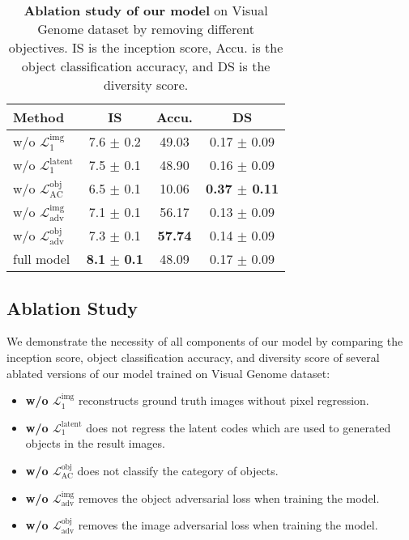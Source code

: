\documentclass[10pt,twocolumn,letterpaper]{article}
\begin{document}
\begin{table}[!t]
\centering
\begin{tabular}{l|ccc}
\textbf{Method}     & \textbf{IS}   & \textbf{Accu.}  & \textbf{DS}   \\\hline 
w/o $\mathcal{L}_1^\mathrm{img }$      & 7.6 $\pm$ 0.2   & 49.03 & 0.17 $\pm$ 0.09 \\
w/o $\mathcal{L}_1^\mathrm{latent}$   & 7.5 $\pm$ 0.1   & 48.90 & 0.16 $\pm$ 0.09 \\
w/o $\mathcal{L}_\mathrm{AC}^\mathrm{obj}$        & 6.5 $\pm$ 0.1   & 10.06 & \textbf{0.37 $\pm$ 0.11} \\
w/o $\mathcal{L}_\mathrm{adv}^\mathrm{img}$ & 7.1 $\pm$ 0.1 & 56.17 & 0.13 $\pm$ 0.09\\
w/o $\mathcal{L}_\mathrm{adv}^\mathrm{obj}$ & 7.3 $\pm$ 0.1 & \textbf{57.74} & 0.14 $\pm$ 0.09 \\\hline
full model         & \textbf{8.1} $\pm$ \textbf{0.1} & 48.09 &  0.17 $\pm$ 0.09 \\ 
\end{tabular}
\vspace{0.1in}
\caption{\textbf{Ablation study of our model} on Visual Genome dataset by removing different objectives. IS is the inception score, Accu. is the object classification accuracy, and DS is the diversity score.}
\label{tb:ablation}
\vspace{-0.2in}
\end{table}



\subsection{Ablation Study}
We demonstrate the necessity of all components of our model by comparing the inception score, object classification accuracy, and diversity score of several ablated versions of our model trained on Visual Genome dataset:
\begin{itemize}[leftmargin=*]
\setlength{\itemsep}{0pt}
	\item \textbf{w/o $\mathcal{L}_1^\mathrm{img}$} reconstructs ground truth images without pixel regression.
	\item \textbf{w/o $\mathcal{L}_1^\mathrm{latent}$} does not regress the latent codes which are used to generated objects in the result images.
	\item \textbf{w/o $\mathcal{L}_\mathrm{AC}^{\mathrm{obj}}$} does not classify the category of objects.
	\item \textbf{w/o $\mathcal{L}_\mathrm{adv}^\mathrm{img}$} removes the object adversarial loss when training the model.
	\item \textbf{w/o $\mathcal{L}_\mathrm{adv}^\mathrm{obj}$} removes the image adversarial loss when training the model.
\end{itemize}
\end{document}
